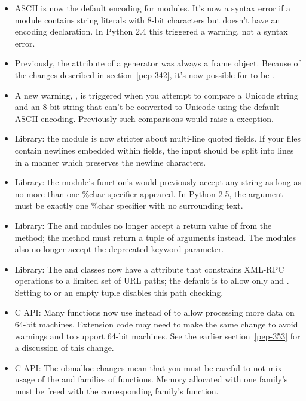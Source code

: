 \documentclass{howto}
\begin{document}
\begin{itemize}

\item ASCII is now the default encoding for modules.  It's now 
a syntax error if a module contains string literals with 8-bit
characters but doesn't have an encoding declaration.  In Python 2.4
this triggered a warning, not a syntax error.

\item Previously, the  attribute of a generator
was always a frame object.  Because of the  changes
described in section~\ref{pep-342}, it's now possible
for  to be .

\item A new warning, , is triggered when 
you attempt to compare a Unicode string and an 8-bit string that can't
be converted to Unicode using the default ASCII encoding.  Previously
such comparisons would raise a  exception.

\item Library: the  module is now stricter about multi-line quoted
fields.  If your files contain newlines embedded within fields, the
input should be split into lines in a manner which preserves the
newline characters.

\item Library: the  module's 
 function's would previously 
accept any string as long as no more than one \%char specifier
appeared.  In Python 2.5, the argument must be exactly one \%char
specifier with no surrounding text. 

\item Library: The  and  modules no
longer accept a return value of  from the
 method; the method must return a tuple of
arguments instead.  The modules also no longer accept the deprecated
 keyword parameter.

\item Library: The  and  
classes now have a  attribute that constrains
XML-RPC operations to a limited set of URL paths; the default is
to allow only  and .  Setting 
 to  or an empty tuple disables 
this path checking.

\item C API: Many functions now use  
instead of  to allow processing more data on 64-bit
machines.  Extension code may need to make the same change to avoid
warnings and to support 64-bit machines.  See the earlier
section~\ref{pep-353} for a discussion of this change.

\item C API: 
The obmalloc changes mean that 
you must be careful to not mix usage 
of the  and 
families of functions. Memory allocated with 
one family's  must be 
freed with the corresponding family's  function.

\end{itemize}
\end{document}
